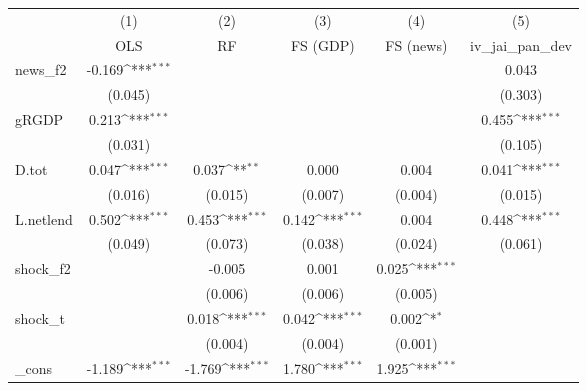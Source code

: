 {
\def\sym#1{\ifmmode^{#1}\else\(^{#1}\)\fi}
\begin{tabular}{l*{5}{c}}
\toprule
            &\multicolumn{1}{c}{(1)}&\multicolumn{1}{c}{(2)}&\multicolumn{1}{c}{(3)}&\multicolumn{1}{c}{(4)}&\multicolumn{1}{c}{(5)}\\
            &\multicolumn{1}{c}{OLS}&\multicolumn{1}{c}{RF}&\multicolumn{1}{c}{FS (GDP)}&\multicolumn{1}{c}{FS (news)}&\multicolumn{1}{c}{iv\_jai\_pan\_dev}\\
\midrule
news\_f2     &      -0.169\sym{***}&                     &                     &                     &       0.043         \\
            &     (0.045)         &                     &                     &                     &     (0.303)         \\
\addlinespace
gRGDP       &       0.213\sym{***}&                     &                     &                     &       0.455\sym{***}\\
            &     (0.031)         &                     &                     &                     &     (0.105)         \\
\addlinespace
D.tot       &       0.047\sym{***}&       0.037\sym{**} &       0.000         &       0.004         &       0.041\sym{***}\\
            &     (0.016)         &     (0.015)         &     (0.007)         &     (0.004)         &     (0.015)         \\
\addlinespace
L.netlend   &       0.502\sym{***}&       0.453\sym{***}&       0.142\sym{***}&       0.004         &       0.448\sym{***}\\
            &     (0.049)         &     (0.073)         &     (0.038)         &     (0.024)         &     (0.061)         \\
\addlinespace
shock\_f2    &                     &      -0.005         &       0.001         &       0.025\sym{***}&                     \\
            &                     &     (0.006)         &     (0.006)         &     (0.005)         &                     \\
\addlinespace
shock\_t     &                     &       0.018\sym{***}&       0.042\sym{***}&       0.002\sym{*}  &                     \\
            &                     &     (0.004)         &     (0.004)         &     (0.001)         &                     \\
\addlinespace
\_cons      &      -1.189\sym{***}&      -1.769\sym{***}&       1.780\sym{***}&       1.925\sym{***}&                     \\

\end{tabular}}
